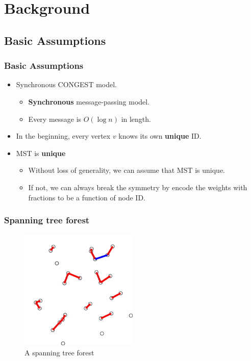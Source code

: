 \section{Background}

\subsection{Basic Assumptions}

\begin{frame}
\frametitle{Basic Assumptions}
\begin{itemize}
\item Synchronous CONGEST model.
\begin{itemize}
    \item \textbf{Synchronous} message-passing model.
    \item Every message is $O(\log n)$ in length.
\end{itemize}
\item In the beginning, every vertex $v$ knows its own \textbf{unique} ID.
\item MST is \textbf{unique}
\begin{itemize}
    \item Without loss of generality, we can assume that MST is unique.
    \item If not, we can always break the symmetry by encode the weights with fractions to be a function of node ID.
\end{itemize}
\end{itemize}
\end{frame}

\begin{frame}
\frametitle{Spanning tree forest}
\begin{figure}
\centering
\includegraphics[width=0.5\textwidth]{figures/KruskalDemo-36.png}
\caption{A spanning tree forest}
\end{figure}
\end{frame}

